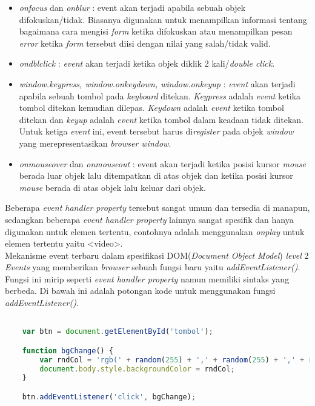 \begin{itemize}
	\item \textit{onfocus} dan \textit{onblur} : event akan terjadi apabila sebuah objek difokuskan/tidak. Biasanya digunakan untuk menampilkan informasi tentang bagaimana cara mengisi \textit{form} ketika difokuskan atau menampilkan pesan \textit{error} ketika \textit{form} tersebut diisi dengan nilai yang salah/tidak valid.
	\item \textit{ondblclick} : \textit{event} akan terjadi ketika objek diklik 2 kali/\textit{double click}.
	\item \textit{window.keypress, window.onkeydown, window.onkeyup} : \textit{event} akan terjadi apabila sebuah tombol pada \textit{keyboard} ditekan. \textit{Keypress} adalah \textit{event} ketika tombol ditekan kemudian dilepas. \textit{Keydown} adalah \textit{event} ketika tombol ditekan dan \textit{keyup} adalah \textit{event} ketika tombol dalam keadaan tidak ditekan. Untuk ketiga \textit{event} ini, event tersebut harus di\textit{register} pada objek \textit{window} yang merepresentasikan \textit{browser window}.
	\item \textit{onmouseover} dan \textit{onmouseout} : event akan terjadi ketika posisi kursor \textit{mouse} berada luar objek lalu ditempatkan di atas objek dan ketika posisi kursor \textit{mouse} berada di atas objek lalu keluar dari objek. 
\end{itemize}

Beberapa \textit{event handler property} tersebut sangat umum dan tersedia di manapun, sedangkan beberapa \textit{event handler property} lainnya sangat spesifik dan hanya digunakan untuk elemen tertentu, contohnya adalah menggunakan \textit{onplay} untuk elemen tertentu yaitu <video>.\\

Mekanisme event terbaru dalam spesifikasi DOM(\textit{Document Object Model}) \textit{level} 2 \textit{Events} yang memberikan \textit{browser} sebuah fungsi baru yaitu \textit{addEventListener()}. Fungsi ini mirip seperti \textit{event handler property} namun memiliki sintaks yang berbeda. Di bawah ini adalah potongan kode untuk menggunakan fungsi \textit{addEventListener()}.

\begin{lstlisting}[language=Javascript, caption=Menggunakan fungsi addEventListener()]

	var btn = document.getElementById('tombol');

	function bgChange() {
  		var rndCol = 'rgb(' + random(255) + ',' + random(255) + ',' + random(255) + ')';
  		document.body.style.backgroundColor = rndCol;
	}   

	btn.addEventListener('click', bgChange);
	
\end{lstlisting}

